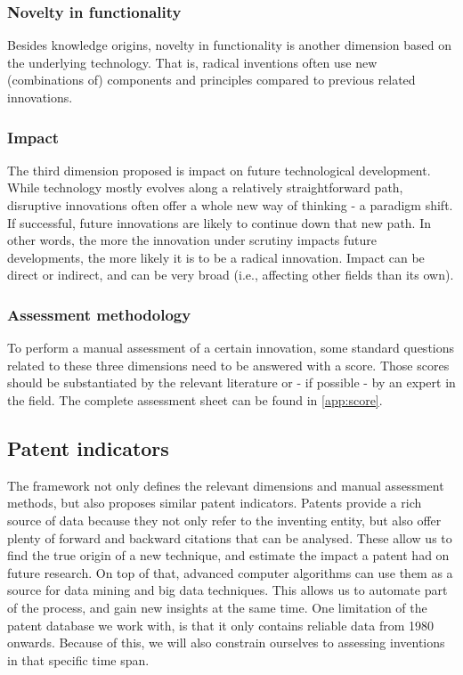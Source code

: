 \subsubsection{Novelty in functionality}
Besides knowledge origins, novelty in functionality is another dimension based
on the underlying technology. That is, radical inventions often use 
new (combinations of) components and principles compared to previous related
innovations.

\subsubsection{Impact}
The third dimension proposed is impact on future technological development.
While technology mostly evolves along a relatively straightforward path,
disruptive innovations often offer a whole new way of thinking - a paradigm
shift. If successful, future innovations are likely to continue down that new
path. In other words, the more the innovation under scrutiny impacts future
developments, the more likely it is to be a radical innovation. Impact can be
direct or indirect, and can be very broad (i.e., affecting other fields than
its own).

\subsubsection{Assessment methodology}
To perform a manual assessment of a certain innovation, some standard questions
related to these three dimensions need to be answered with a score. Those
scores should be substantiated by the relevant literature  or - if possible - by
an expert in the field. The complete assessment sheet can be found in
\autoref{app:score}.

\subsection{Patent indicators}
The framework not only defines the relevant dimensions and manual assessment
methods, but also proposes similar patent indicators. Patents provide a rich
source of data because they not only refer to the inventing entity, but also
offer plenty of forward and backward citations that can be analysed. These
allow us to find the true origin of a new technique, and estimate the impact a
patent had on future research. On top of that, advanced computer algorithms can
use them as a source for data mining and big data techniques. This allows us to
automate part of the process, and gain new insights at the same time. One
limitation of the patent database we work with, is that it only contains
reliable data from 1980 onwards. Because of this, we will also constrain
ourselves to assessing inventions in that specific time span.

